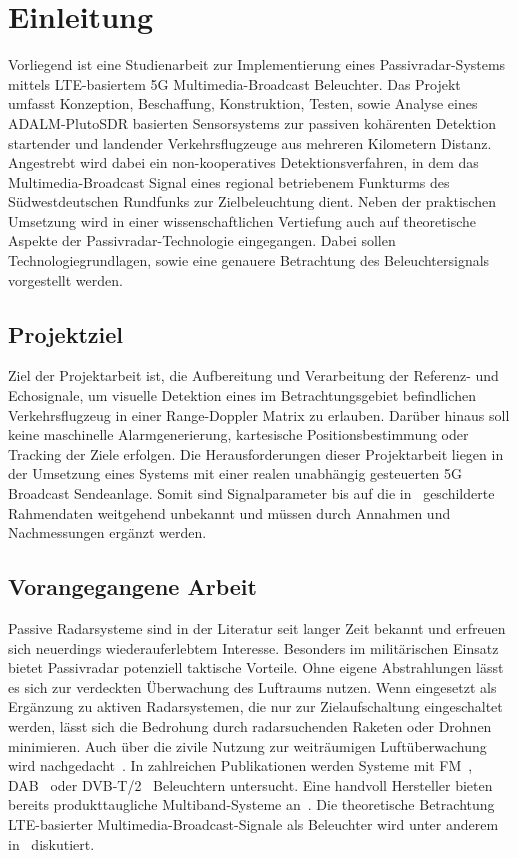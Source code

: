 \chapter{Einleitung}

Vorliegend ist eine Studienarbeit zur Implementierung eines Passivradar-Systems mittels LTE-basiertem 5G Multimedia-Broadcast Beleuchter. Das Projekt umfasst Konzeption, Beschaffung, Konstruktion, Testen, sowie Analyse eines ADALM-PlutoSDR basierten Sensorsystems zur passiven kohärenten Detektion startender und landender Verkehrsflugzeuge aus mehreren Kilometern Distanz. Angestrebt wird dabei ein non-kooperatives Detektionsverfahren, in dem das Multimedia-Broadcast Signal eines regional betriebenem Funkturms des Südwestdeutschen Rundfunks zur Zielbeleuchtung dient. Neben der praktischen Umsetzung wird in einer wissenschaftlichen Vertiefung auch auf theoretische Aspekte der Passivradar-Technologie eingegangen. Dabei sollen Technologiegrundlagen, sowie eine genauere Betrachtung des Beleuchtersignals vorgestellt werden.

\section{Projektziel}

Ziel der Projektarbeit ist, die Aufbereitung und Verarbeitung der Referenz- und Echosignale, um visuelle Detektion eines im Betrachtungsgebiet befindlichen Verkehrsflugzeug in einer Range-Doppler Matrix zu erlauben. Darüber hinaus soll keine maschinelle Alarmgenerierung, kartesische Positionsbestimmung oder Tracking der Ziele erfolgen. Die Herausforderungen dieser Projektarbeit liegen in der Umsetzung eines Systems mit einer realen unabhängig gesteuerten 5G Broadcast Sendeanlage. Somit sind Signalparameter bis auf die in~\cite{5GMAG2020} geschilderte Rahmendaten weitgehend unbekannt und müssen durch Annahmen und Nachmessungen ergänzt werden.

\section{Vorangegangene Arbeit}

Passive Radarsysteme sind in der Literatur seit langer Zeit bekannt und erfreuen sich neuerdings wiederauferlebtem Interesse. Besonders im militärischen Einsatz bietet Passivradar potenziell taktische Vorteile. Ohne eigene Abstrahlungen lässt es sich zur verdeckten Überwachung des Luftraums nutzen. Wenn eingesetzt als Ergänzung zu aktiven Radarsystemen, die nur zur Zielaufschaltung eingeschaltet werden, lässt sich die Bedrohung durch radarsuchenden Raketen oder Drohnen minimieren. Auch über die zivile Nutzung zur weiträumigen Luftüberwachung wird nachgedacht~\cite{Stahl2018}. In zahlreichen Publikationen werden Systeme mit FM~\cite{Lallo2008,Xie2018}, DAB~\cite{Winkler2021} oder DVB-T/2~\cite{Conti2016,Winkler2017} Beleuchtern untersucht. Eine handvoll Hersteller bieten bereits produkttaugliche Multiband-Systeme an~\cite{Lutz2018}. Die theoretische Betrachtung LTE-basierter Multimedia-Broadcast-Signale als Beleuchter wird unter anderem in~\cite{Klöck2019} diskutiert.
